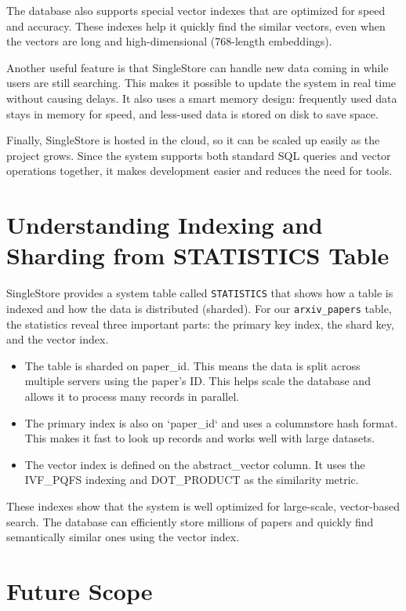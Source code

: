 \documentclass[11pt]{article}
\begin{document}
The database also supports special vector indexes that are optimized for speed and accuracy. These indexes help it quickly find the similar vectors, even when the vectors are long and high-dimensional (768-length embeddings).

Another useful feature is that SingleStore can handle new data coming in while users are still searching. This makes it possible to update the system in real time without causing delays. It also uses a smart memory design: frequently used data stays in memory for speed, and less-used data is stored on disk to save space.

Finally, SingleStore is hosted in the cloud, so it can be scaled up easily as the project grows. Since the system supports both standard SQL queries and vector operations together, it makes development easier and reduces the need for tools.
\section{Understanding Indexing and Sharding from STATISTICS Table}
\label{sec:orgf23a0f1}

SingleStore provides a system table called \texttt{STATISTICS} that shows how a table is indexed and how the data is distributed (sharded). For our \texttt{arxiv\_papers} table, the statistics reveal three important parts: the primary key index, the shard key, and the vector index.

\begin{itemize}
\item The table is sharded on paper\_id. This means the data is split across multiple servers using the paper's ID. This helps scale the database and allows it to process many records in parallel.
\item The primary index is also on `paper\_id` and uses a columnstore hash format. This makes it fast to look up records and works well with large datasets.
\item The vector index is defined on the abstract\_vector column. It uses the IVF\_PQFS indexing and DOT\_PRODUCT as the similarity metric.
\end{itemize}

These indexes show that the system is well optimized for large-scale, vector-based search. The database can efficiently store millions of papers and quickly find semantically similar ones using the vector index.
\section{Future Scope}
\label{sec:org694d9e9}
\end{document}

